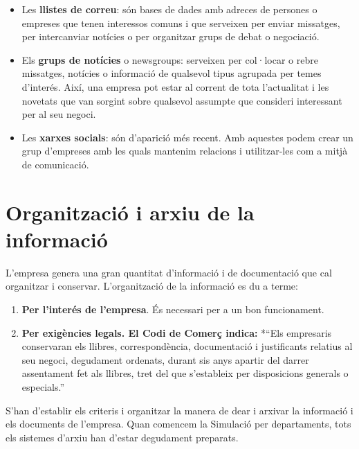 \documentclass[
  openany]{book}
\begin{document}
\begin{itemize}
\item
  Les \textbf{llistes de correu}: són bases de dades amb adreces de persones o empreses que tenen interessos comuns i que serveixen per enviar missatges, per intercanviar notícies o per organitzar grups de debat o negociació.
\item
  Els \textbf{grups de notícies} o newsgroups: serveixen per col·locar o rebre missatges, notícies o informació de qualsevol tipus agrupada per temes d'interés. Així, una empresa pot estar al corrent de tota l'actualitat i les novetats que van sorgint sobre qualsevol assumpte que consideri interessant per al seu negoci.
\item
  Les \textbf{xarxes socials}: són d'aparició més recent. Amb aquestes podem crear un grup d'empreses amb les quals mantenim relacions i utilitzar-les com a mitjà de comunicació.
\end{itemize}

\hypertarget{organitzaciuxf3-i-arxiu-de-la-informaciuxf3}{%
\chapter{Organització i arxiu de la informació}\label{organitzaciuxf3-i-arxiu-de-la-informaciuxf3}}

L'empresa genera una gran quantitat d'informació i de documentació que cal organitzar i conservar. L'organització de la informació es du a terme:

\begin{enumerate}
\def\labelenumi{\alph{enumi}.}
\item
  \textbf{Per l'interés de l'empresa}. És necessari per a un bon funcionament.
\item
  \textbf{Per exigències legals. El Codi de Comerç indica:} *``Els empresaris conservaran els llibres, correspondència, documentació i justificants relatius al seu negoci, degudament ordenats, durant sis anys apartir del darrer assentament fet als llibres, tret del que s'estableix per disposicions generals o especials.''
\end{enumerate}

S'han d'establir els criteris i organitzar la manera de dear i arxivar la informació i els documents de l'empresa. Quan comencem la Simulació per departaments, tots els sistemes d'arxiu han d'estar degudament preparats.
\end{document}
